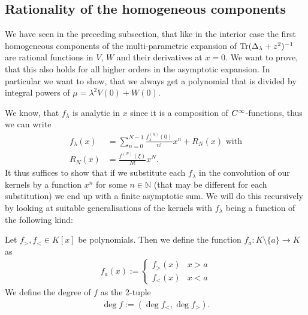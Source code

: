 \subsection{Rationality of the homogeneous components}
We have seen in the preceding subsection, that like in the interior case the
first homogeneous components of the multi-parametric expansion of
$\operatorname{Tr}(\Delta_\lambda + z^2)^{-1}$ are rational functions in $V$, $W$ and their
derivatives at $x = 0$. We want to prove, that this also holds for all higher
orders in the asymptotic expansion. In particular we want to show, that we
always get a polynomial that is divided by integral powers of $\mu = \lambda^2
V(0) + W(0)$. %

We know, that $f_\lambda$ is analytic in $x$ since it is a composition of
$C^\infty_{}$-functions, thus we can write
\begin{align*}
  f_\lambda(x) &= \sum_{n=0}^{N-1} \frac{f_\lambda^{(n)}(0)}{n!} x^n + R_N(x)
  \text{ with} \\ R_N(x) &= \frac{f^{(N)}(\xi)}{N!} x^{N}.
\end{align*}
It thus suffices to show that if we substitute each $f_\lambda$ in the
convolution of our kernels by a function $x^{n}$ for some $n\in\mathbb{N}$ (that
may be different for each substitution) we end up with a finite asymptotic sum.
We will do this recursively by looking at suitable generalisations of the
kernels with $f_\lambda$ being a function of the following kind:
\begin{Definition}
  Let $f_>, f_<\in K[x]$ be polynomials. Then we define the function $f_a\colon
  K\setminus\{a\}\to K$ as 
  \begin{align*}
    f_a(x) := \begin{cases}
      f_>(x) & x > a \\
      f_<(x) & x < a
    \end{cases}
  \end{align*}
  We define the degree of $f$ as the 2-tuple
  \begin{align*}
    \deg f := \left(\deg f_<, \deg f_>\right).
  \end{align*}
\end{Definition}

